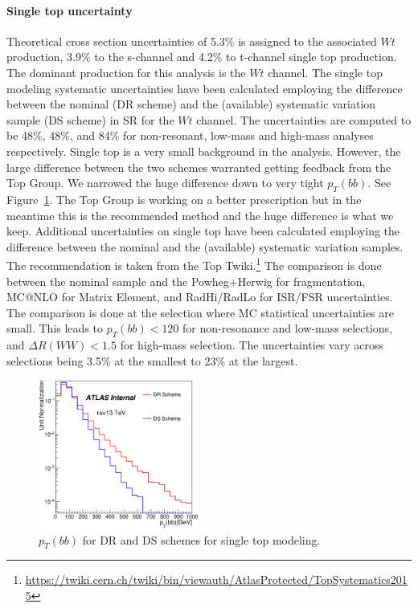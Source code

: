 \paragraph{Single top uncertainty}
Theoretical cross section uncertainties of 5.3\% is assigned to the associated $Wt$ production,  3.9\% to the s-channel and 4.2\% to t-channel single top production.  The dominant production for this analysis is the $Wt$ channel.  The single top modeling systematic uncertainties have been calculated employing the difference between the nominal (DR scheme) and the (available) systematic variation sample (DS scheme) in SR for the $Wt$ channel. The uncertainties are computed to be 48\%, 48\%, and 84\% for non-resonant, low-mass and high-mass analyses respectively.  Single top is a very small background in the analysis. However, the large difference between the two schemes warranted getting feedback from the Top Group. We narrowed the huge difference down to very tight $p_{T} (bb)$. See Figure~\ref{fig:stop_bbpt}. The Top Group is working on a better prescription but in the meantime this is the recommended method and the huge difference is what we keep. 
Additional uncertainties on single top have been calculated employing the difference between the nominal and the (available) systematic variation samples. The recommendation is taken from the Top Twiki.{\footnote {\url{https://twiki.cern.ch/twiki/bin/viewauth/AtlasProtected/TopSystematics2015}}} 
The comparison is done between the nominal sample and the Powheg+Herwig for fragmentation, MC@NLO for Matrix Element, and RadHi/RadLo for ISR/FSR uncertainties. The comparison is done at the selection where MC statistical uncertainties are small. This leads to $p_{T}(bb) < 120$ for non-resonance and low-mass selections, and $\Delta R(WW) < 1.5$ for high-mass selection. 
The uncertainties vary across selections being 3.5\% at the smallest to 23\% at the largest.%

\begin{figure}[!h]
\begin{center}
\includegraphics*[width=0.47\textwidth] {figures/DR_DS_bbpt.eps}
\caption[$p_{T}(bb)$  for DR and DS schemes for single top modeling.]{$p_{T}(bb)$  for DR and DS schemes for single top modeling.}
\label{fig:stop_bbpt}
\end{center}
\end{figure}

